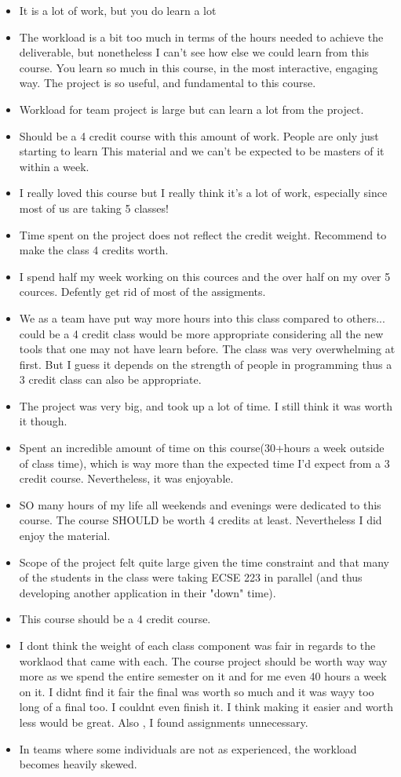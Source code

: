 \begin{itemize}[leftmargin=0.5cm]
\item It is a lot of work, but you do learn a lot 
\item The workload is a bit too much in terms of the hours needed to achieve the deliverable, but nonetheless I can't see how else we could learn from this course. You learn so much in this course, in the most interactive, engaging way. The project is so useful, and fundamental to this course. 
\item Workload for team project is large but can learn a lot from the project. 
\item Should be a 4 credit course with this amount of work. People are only just starting to learn This material and we can't be expected to be masters of it within a week. 
\item I really loved this course but I really think it's a lot of work, especially since most of us are taking 5 classes! 
\item Time spent on the project does not reflect the credit weight. Recommend to make the class 4 credits worth. 
\item I spend half my week working on this cources and the over half on my over 5 cources. Defently get rid of most of the assigments. 
\item We as a team have put way more hours into this class compared to others... could be a 4 credit class would be more appropriate considering all the new tools that one may not have learn before. The class was very overwhelming at first. But I guess it depends on the strength of people in programming thus a 3 credit class can also be appropriate. 
\item The project was very big, and took up a lot of time. I still think it was worth it though. 
\item Spent an incredible amount of time on this course(30+hours a week outside of class time), which is way more than the expected time I'd expect from a 3 credit course. Nevertheless, it was enjoyable. 
\item SO many hours of my life all weekends and evenings were dedicated to this course. The course SHOULD be worth 4 credits at least. Nevertheless I did enjoy the material. 
\item Scope of the project felt quite large given the time constraint and that many of the students in the class were taking ECSE 223 in parallel (and thus developing another application in their "down" time). 
\item This course should be a 4 credit course. 
\item I dont think the weight of each class component was fair in regards to the worklaod that came with each. The course project should be worth way way more as we spend the entire semester on it and for me even 40 hours a week on it. I didnt find it fair the final was worth so much and it was wayy too long of a final too. I couldnt even finish it. I think making it easier and worth less would be great. Also , I found assignments unnecessary. 
\item In teams where some individuals are not as experienced, the workload becomes heavily skewed. 
\end{itemize}

